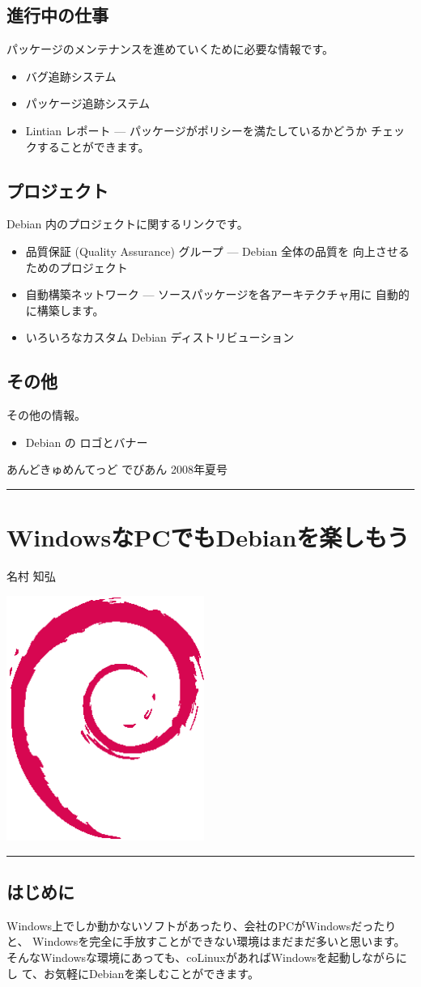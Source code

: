\documentclass[mingoth,a4paper]{jsarticle}
\renewcommand{\dancersection}[2]{%
\newpage
あんどきゅめんてっど でびあん 2008年夏号
%
\vspace{0.1mm}\\
{\color{dancerlightblue}\rule{\hsize}{2mm}}

%
%
\begin{minipage}[t]{0.6\hsize}
\color{dancerdarkblue}
\vspace{1cm}
\section{#1}
\hfill{}#2\\
\end{minipage}
\begin{minipage}[t]{0.4\hsize}
\vspace{-2cm}
\hfill{}\includegraphics[height=8cm]{image200502/openlogo-nd.eps}\\
\vspace{-5cm}
\end{minipage}
%
%
{\color{dancerdarkblue}\rule{0.74\hsize}{2mm}}
%
\vspace{2cm}
}
\begin{document}
\subsection{進行中の仕事}

パッケージのメンテナンスを進めていくために必要な情報です。

\begin{itemize}
\item バグ追跡システム
\item パッケージ追跡システム
\item Lintian レポート --- パッケージがポリシーを満たしているかどうか
  チェックすることができます。
\end{itemize}

\subsection{プロジェクト}

Debian 内のプロジェクトに関するリンクです。

\begin{itemize}
\item 品質保証 (Quality Assurance) グループ --- Debian 全体の品質を
  向上させるためのプロジェクト
\item 自動構築ネットワーク --- ソースパッケージを各アーキテクチャ用に
  自動的に構築します。
\item いろいろなカスタム Debian ディストリビューション
\end{itemize}

\subsection{その他}

その他の情報。

\begin{itemize}
\item Debian の ロゴとバナー
\end{itemize}

\dancersection{WindowsなPCでもDebianを楽しもう}{名村 知弘}

\subsection{はじめに}
Windows上でしか動かないソフトがあったり、会社のPCがWindowsだったりと、
Windowsを完全に手放すことができない環境はまだまだ多いと思います。
そんなWindowsな環境にあっても、coLinuxがあればWindowsを起動しながらにし
て、お気軽にDebianを楽しむことができます。
\end{document}
